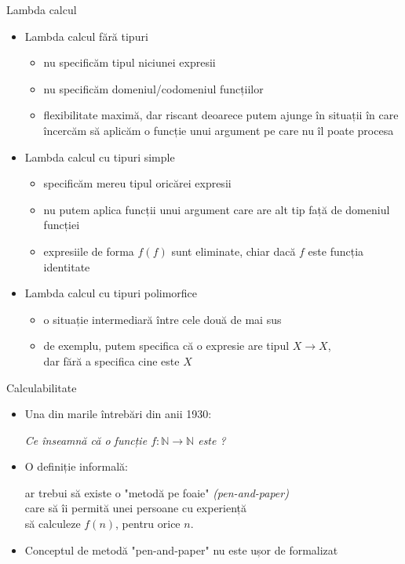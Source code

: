 \documentclass[xcolor=pdftex,romanian,colorlinks]{beamer}
\begin{document}
\begin{frame}{Lambda calcul}

\begin{itemize}
	\item \alert{Lambda calcul fără tipuri}
	\begin{itemize}
		\item nu specificăm tipul niciunei expresii 
		\item nu specificăm domeniul/codomeniul funcțiilor
		\item flexibilitate maximă, dar riscant deoarece putem ajunge în situații în care încercăm să aplicăm o funcție unui argument pe care nu îl poate procesa
	\end{itemize}
	\medskip
	\item \alert{Lambda calcul cu tipuri simple}
	\begin{itemize}
		\item specificăm mereu tipul oricărei expresii
		\item nu putem aplica funcții unui argument care are alt tip față de domeniul funcției
		\item expresiile de forma $f(f)$ sunt eliminate, chiar dacă $f$ este funcția identitate
 	\end{itemize}
	\medskip
	\item \alert{Lambda calcul cu tipuri polimorfice}
	\begin{itemize}
		\item o situație intermediară între cele două de mai sus
		\item de exemplu, putem specifica că o expresie are tipul $X \to X$, \\ dar fără a specifica cine este $X$
 	\end{itemize}
\end{itemize}

\end{frame}

\begin{frame}{Calculabilitate}

\begin{itemize}
	\item Una din marile întrebări din anii 1930:
	\begin{center}
	\textit{ Ce înseamnă că o funcție $f : \mathbb{N} \to \mathbb{N}$ este ?}
	\end{center}
	\medskip
	\item O definiție informală: 
	\begin{center}
	ar trebui să existe o "metodă pe foaie" \textit{(pen-and-paper)} \\care să îi permită unei persoane cu experiență \\ să calculeze  $f(n)$, pentru orice $n$.
	\end{center}
	\medskip
	\item Conceptul de metodă "pen-and-paper" nu este ușor de formalizat
\end{itemize}

\end{frame}
\end{document}
